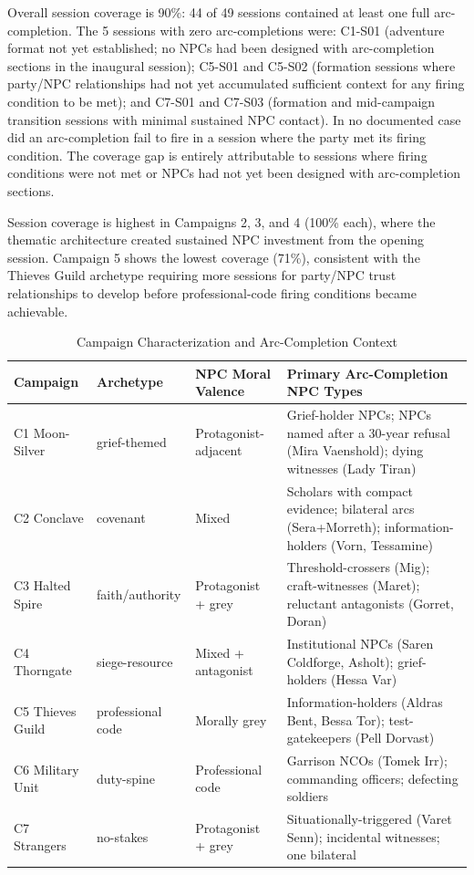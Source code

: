 Overall session coverage is 90\%: 44 of 49 sessions contained at least
one full arc-completion. The 5 sessions with zero arc-completions were:
C1-S01 (adventure format not yet established; no NPCs had been designed
with arc-completion sections in the inaugural session); C5-S01 and C5-S02
(formation sessions where party/NPC relationships had not yet accumulated
sufficient context for any firing condition to be met); and C7-S01 and C7-S03
(formation and mid-campaign transition sessions with minimal sustained NPC
contact). In no documented case did an arc-completion fail to fire in a session
where the party met its firing condition. The coverage gap is entirely
attributable to sessions where firing conditions were not met or NPCs had not
yet been designed with arc-completion sections.

Session coverage is highest in Campaigns 2, 3, and 4 (100\% each), where the
thematic architecture created sustained NPC investment from the opening session.
Campaign 5 shows the lowest coverage (71\%), consistent with the Thieves Guild
archetype requiring more sessions for party/NPC trust relationships to develop
before professional-code firing conditions became achievable.

\begin{table}[t]
\caption{Campaign Characterization and Arc-Completion Context}
\label{tab:campaigns}
\renewcommand{\arraystretch}{1.2}
\begin{tabular}{@{}lp{2.8cm}p{3.0cm}p{5.0cm}@{}}
\toprule
\textbf{Campaign} & \textbf{Archetype} & \textbf{NPC Moral Valence} &
\textbf{Primary Arc-Completion NPC Types} \\
\midrule
C1 Moon-Silver   & grief-themed      & Protagonist-adjacent  &
  Grief-holder NPCs; NPCs named after a 30-year refusal (Mira Vaenshold); dying witnesses (Lady Tiran) \\
C2 Conclave      & covenant          & Mixed                 &
  Scholars with compact evidence; bilateral arcs (Sera+Morreth); information-holders (Vorn, Tessamine) \\
C3 Halted Spire  & faith/authority   & Protagonist + grey    &
  Threshold-crossers (Mig); craft-witnesses (Maret); reluctant antagonists (Gorret, Doran) \\
C4 Thorngate     & siege-resource    & Mixed + antagonist    &
  Institutional NPCs (Saren Coldforge, Asholt); grief-holders (Hessa Var) \\
C5 Thieves Guild & professional code & Morally grey          &
  Information-holders (Aldras Bent, Bessa Tor); test-gatekeepers (Pell Dorvast) \\
C6 Military Unit & duty-spine        & Professional code     &
  Garrison NCOs (Tomek Irr); commanding officers; defecting soldiers \\
C7 Strangers     & no-stakes         & Protagonist + grey    &
  Situationally-triggered (Varet Senn); incidental witnesses; one bilateral \\
\bottomrule
\end{tabular}
\end{table}

